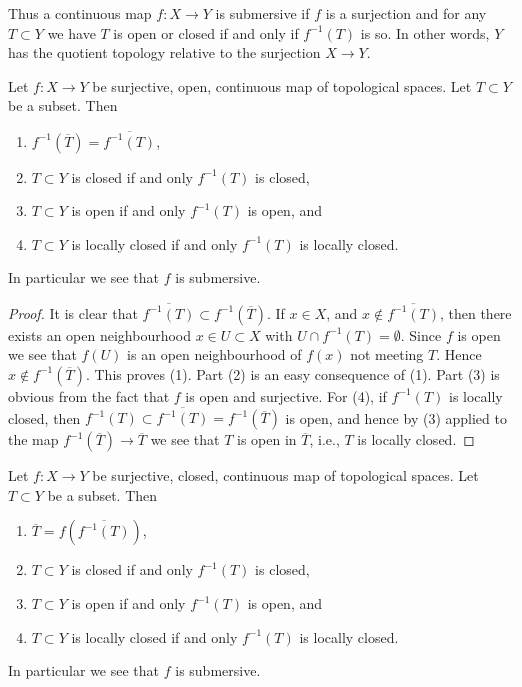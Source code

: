 \noindent
Thus a continuous map $f : X \to Y$ is submersive if $f$
is a surjection and for any $T \subset Y$ we have
$T$ is open or closed if and only if $f^{-1}(T)$ is so.
In other words, $Y$ has the
quotient topology relative to the surjection $X \to Y$.

\begin{lemma}
\label{lemma-open-morphism-quotient-topology}
Let $f : X \to Y$ be surjective, open, continuous map of topological spaces.
Let $T \subset Y$ be a subset. Then
\begin{enumerate}
\item $f^{-1}(\overline{T}) = \overline{f^{-1}(T)}$,
\item $T \subset Y$ is closed if and only $f^{-1}(T)$ is closed,
\item $T \subset Y$ is open if and only $f^{-1}(T)$ is open, and
\item $T \subset Y$ is locally closed if and only $f^{-1}(T)$ is locally closed.
\end{enumerate}
In particular we see that $f$ is submersive.
\end{lemma}

\begin{proof}
It is clear that $\overline{f^{-1}(T)} \subset f^{-1}(\overline{T})$.
If $x \in X$, and $x \not \in \overline{f^{-1}(T)}$, then there
exists an open neighbourhood $x \in U \subset X$ with
$U \cap f^{-1}(T) = \emptyset$. Since $f$ is open we see that
$f(U)$ is an open neighbourhood of $f(x)$ not meeting $T$.
Hence $x \not \in f^{-1}(\overline{T})$. This proves (1).
Part (2) is an easy consequence of (1).
Part (3) is obvious from the fact that $f$ is open and surjective.
For (4), if $f^{-1}(T)$ is locally closed, then
$f^{-1}(T) \subset \overline{f^{-1}(T)} = f^{-1}(\overline{T})$
is open, and hence by (3) applied to the map
$f^{-1}(\overline{T}) \to \overline{T}$ we see that
$T$ is open in $\overline{T}$, i.e., $T$ is locally closed.
\end{proof}

\begin{lemma}
\label{lemma-closed-morphism-quotient-topology}
Let $f : X \to Y$ be surjective, closed, continuous map of topological spaces.
Let $T \subset Y$ be a subset. Then
\begin{enumerate}
\item $\overline{T} = f(\overline{f^{-1}(T)})$,
\item $T \subset Y$ is closed if and only $f^{-1}(T)$ is closed,
\item $T \subset Y$ is open if and only $f^{-1}(T)$ is open, and
\item $T \subset Y$ is locally closed if and only $f^{-1}(T)$ is locally closed.
\end{enumerate}
In particular we see that $f$ is submersive.
\end{lemma}

